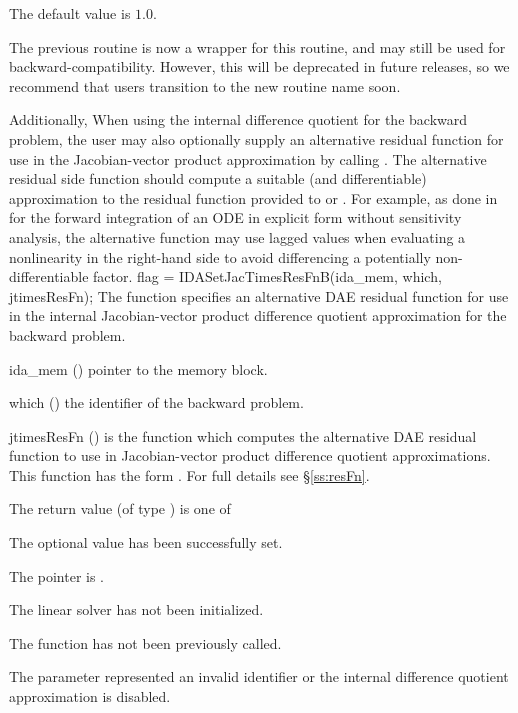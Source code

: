 {
  The default value is $1.0$.

  The previous routine  is now a
  wrapper for this routine, and may still be used for
  backward-compatibility.  However, this will be deprecated in future
  releases, so we recommend that users transition to the new routine
  name soon.
}
Additionally, When using the internal difference quotient for the backward
problem, the user may also optionally supply an alternative residual function
for use in the Jacobian-vector product approximation by calling
. The alternative residual side function should compute
a suitable (and differentiable) approximation to the residual function provided
to  or . For example, as done in
\cite{dorr2010numerical} for the forward integration of an ODE in explicit form
without sensitivity analysis, the alternative function may use lagged values
when evaluating a nonlinearity in the right-hand side to avoid differencing a
potentially non-differentiable factor.
{
  flag = IDASetJacTimesResFnB(ida\_mem, which, jtimesResFn);
}
{
  The function  specifies an alternative DAE residual
  function for use in the internal Jacobian-vector product difference quotient
  approximation for the backward problem.
}
{
  \begin{args}[jtimesResFn]
  \item[ida\_mem] ()
    pointer to the {\idas} memory block.
  \item[which] ()
    the identifier of the backward problem.
  \item[jtimesResFn] ()
    is the {\CC} function which computes the alternative DAE residual function
    to use in Jacobian-vector product difference quotient approximations. This
    function has the form . For full
    details see \S\ref{ss:resFn}.
  \end{args}
}
{
  The return value  (of type ) is one of
  \begin{args}
  \item[\Id{IDALS\_SUCCESS}]
    The optional value has been successfully set.
  \item[\Id{IDALS\_MEM\_NULL}]
    The  pointer is .
  \item[\Id{IDALS\_LMEM\_NULL}]
    The {\idals} linear solver has not been initialized.
  \item[\Id{IDALS\_NO\_ADJ}]
    The function  has not been previously called.
  \item[\Id{IDALS\_ILL\_INPUT}]
    The parameter  represented an invalid identifier or the internal
    difference quotient approximation is disabled.
  \end{args}
}
